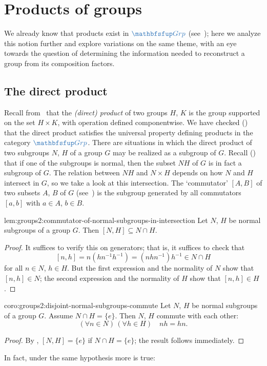 \section{Products of groups}
\label{sec:groups2:products-of-groups}

We already know that products exist in $\categ{Grp}$
(see~); here we analyze this
notion further and explore variations on the same theme, with an eye
towards the question of determining the information needed to
reconstruct a group from its composition factors.

\subsection{The direct product}
\label{subsec:groups2:the-direct-product}
Recall from~ that the
\emph{(direct) product} of two groups $H$, $K$ is the group supported
on the set $H \times K$, with operation defined componentwise. We have
checked () that the direct
product satisfies the universal property defining products in the
category $\categ{Grp}$.  There are situations in which the direct
product of two subgroups $N$, $H$ of a group $G$ may be realized as a
subgroup of $G$. Recall
() that if one of the
subgroups is normal, then the subset $NH$ of $G$ is in fact a subgroup
of $G$. The relation between $NH$ and $N \times H$ depends on how $N$
and $H$ intersect in $G$, so we take a look at this intersection.  The
`commutator' $[A, B]$ of two subsets $A$, $B$ of $G$
(see~)
is the subgroup generated by all commutators $[a, b]$ with $a \in A$,
$b \in B$.
\begin{lem}{}{lem:groups2:commutator-of-normal-subgroups-in-intersection}
  Let $N$, $H$ be normal subgroups of a group $G$. Then
  $[N, H] \subseteq N \cap H$.
\end{lem}
\begin{proof}
  It suffices to verify this on generators; that is, it suffices to
  check that
  \[ [n, h] = n(hn^{-1}h^{-1}) = (nhn^{-1})h^{-1} \in N \cap H
  \]
  for all $n \in N$, $h \in H$. But the first expression and the
  normality of $N$ show that $[n, h] \in N$; the second expression and
  the normality of $H$ show that $[n, h] \in H$.
\end{proof}
\begin{coro}{}{coro:groups2:disjoint-normal-subgroups-commute}
  Let $N$, $H$ be normal subgroups of a group $G$. Assume
  $N \cap H = \{e\}$. Then $N$, $H$ commute with each other:
  \[
    (\forall n \in N)\,(\forall h \in H) \quad nh = hn.
  \]
\end{coro}
\begin{proof}
  By , $[N, H] = \{e\}$ if $N \cap H = \{e\}$;
  the result follows immediately.
\end{proof}
In fact, under the same hypothesis more is true:

